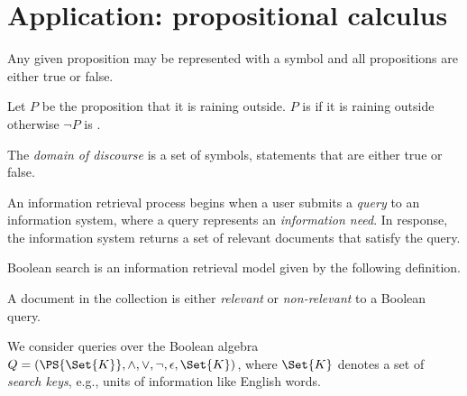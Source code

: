 \documentclass[ ../main.tex]{subfiles}
\begin{document}
\chapter{Application: propositional calculus}
\label{sec:bool_search}
Any given proposition may be represented with a symbol and all propositions are either true or false.
\begin{example}
Let $P$ be the proposition that it is raining outside. $P$ is \True if it is raining outside otherwise $\neg P$ is \True.
\end{example}

The \emph{domain of discourse} is a set of symbols, statements that are either true or false.




An information retrieval process begins when a user submits a \emph{query} to an information system, where a query represents an \emph{information need}.
In response, the information system returns a set of relevant documents that satisfy the query.

Boolean search is an information retrieval model given by the following definition.
\begin{definition}
A document in the collection is either \emph{relevant} or \emph{non-relevant} to a Boolean query.
\end{definition}


We consider queries over the Boolean algebra $Q = (\PS{\Set{K}}, \land, \lor, \neg, \epsilon, \Set{K})$, where $\Set{K}$ denotes a set of \emph{search keys}, e.g., units of information like English words.


\end{document}

